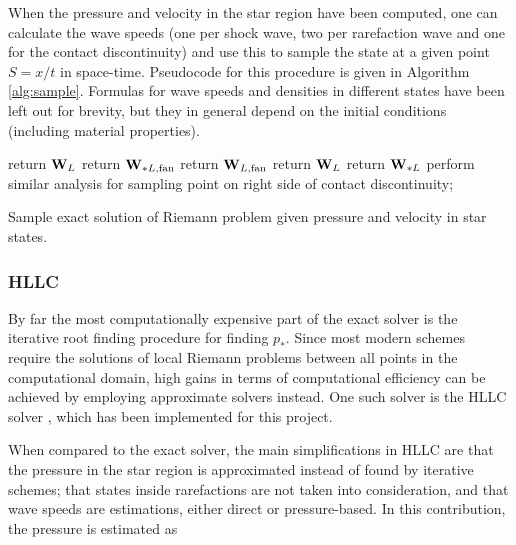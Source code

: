\documentclass[final,3p,twocolumn]{elsarticle}
\begin{document}
When the pressure and velocity in the star region have been computed, one can
calculate the wave speeds (one per shock wave, two per rarefaction wave and one
for the contact discontinuity) and use this to sample the state at a given
point $S = x/t$ in space-time. Pseudocode for this procedure is given in
Algorithm \ref{alg:sample}. Formulas for wave speeds and densities in different
states have been left out for brevity, but they in general depend on the
initial conditions (including material properties).

\begin{algorithm}[htb]
    {
        {
            {
                return ${\bf W}_L$\;
            }
            {
                {
                    return ${\bf W}_{*L, {\rm fan}}$\;
                }
                {
                    return ${\bf W}_{L, {\rm fan}}$\;
                }
            }
        }
        {
            {
                return ${\bf W}_L$\;
            }
            {
                return ${\bf W}_{*L}$\;
            }
        }
    }
    {
        perform similar analysis for sampling point on right side of contact
        discontinuity; 
    }
    \caption{Sample exact solution of Riemann problem given pressure and
    velocity in star states.}
    \label{alg:sample}
\end{algorithm}

\subsubsection{HLLC}
\label{subsubsec:hllc}

By far the most computationally expensive part of the exact solver is the
iterative root finding procedure for finding $p_*$. Since most modern schemes
require the solutions of local Riemann problems between all points in the
computational domain, high gains in terms of computational efficiency can be
achieved by employing approximate solvers instead. One such solver is the HLLC solver
\cite{toro1994restoration}, which has been implemented for this project. 

When compared to the exact solver, the main simplifications in HLLC are that
the pressure in the star region is approximated instead of found by iterative
schemes; that states inside rarefactions are not taken into consideration, and 
that wave speeds are estimations, either direct or pressure-based. In this
contribution, the pressure is estimated as 
\end{document}
